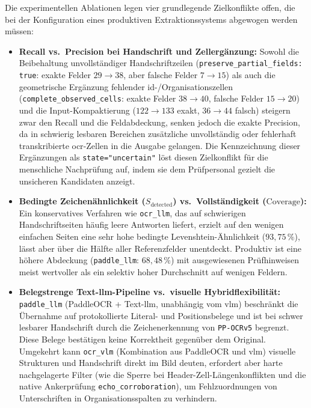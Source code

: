 Die experimentellen Ablationen legen vier grundlegende Zielkonflikte offen, die bei der Konfiguration eines produktiven Extraktionssystems abgewogen werden müssen:
\begin{itemize}
  \item \textbf{Recall vs.\ Precision bei Handschrift und Zellergänzung:} Sowohl die Beibehaltung unvollständiger Handschriftzeilen (\texttt{preserve\_partial\_fields: true}: exakte Felder $29 \rightarrow 38$, aber falsche Felder $7 \rightarrow 15$) als auch die geometrische Ergänzung fehlender \ac{id}-/Organisationszellen (\texttt{complete\_observed\_cells}: exakte Felder $38 \rightarrow 40$, falsche Felder $15 \rightarrow 20$) und die Input-Kompaktierung ($122 \rightarrow 133$ exakt, $36 \rightarrow 44$ falsch) steigern zwar den Recall und die Feldabdeckung, senken jedoch die exakte Precision, da in schwierig lesbaren Bereichen zusätzliche unvollständig oder fehlerhaft transkribierte \ac{ocr}-Zellen in die Ausgabe gelangen. Die Kennzeichnung dieser Ergänzungen als \texttt{state="uncertain"} löst diesen Zielkonflikt für die menschliche Nachprüfung auf, indem sie dem Prüfpersonal gezielt die unsicheren Kandidaten anzeigt.
  \item \textbf{Bedingte Zeichenähnlichkeit ($S_{\mathrm{detected}}$) vs.\ Vollständigkeit ($\mathrm{Coverage}$):} Ein konservatives Verfahren wie \texttt{ocr\_llm}, das auf schwierigen Handschriftseiten häufig leere Antworten liefert, erzielt auf den wenigen einfachen Seiten eine sehr hohe bedingte Levenshtein-Ähnlichkeit ($93{,}75\,\%$), lässt aber über die Hälfte aller Referenzfelder unentdeckt. Produktiv ist eine höhere Abdeckung (\texttt{paddle\_llm}: $68{,}48\,\%$) mit ausgewiesenen Prüfhinweisen meist wertvoller als ein selektiv hoher Durchschnitt auf wenigen Feldern.
  \item \textbf{Belegstrenge Text-\ac{llm}-Pipeline vs.\ visuelle Hybridflexibilität:} \texttt{paddle\_llm} (PaddleOCR + Text-\ac{llm}, unabhängig vom \ac{vlm}) beschränkt die Übernahme auf protokollierte Literal- und Positionsbelege und ist bei schwer lesbarer Handschrift durch die Zeichenerkennung von \texttt{PP-OCRv5} begrenzt. Diese Belege bestätigen keine Korrektheit gegenüber dem Original. Umgekehrt kann \texttt{ocr\_vlm} (Kombination aus PaddleOCR und \ac{vlm}) visuelle Strukturen und Handschrift direkt im Bild deuten, erfordert aber harte nachgelagerte Filter (wie die Sperre bei Header-Zell-Längenkonflikten und die native Ankerprüfung \texttt{echo\_corroboration}), um Fehlzuordnungen von Unterschriften in Organisationsspalten zu verhindern.
\end{itemize}

